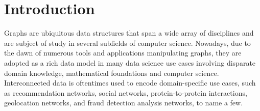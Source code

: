 \section{Introduction}
\label{sec:intro}



Graphs are ubiquitous data structures that span a wide array of disciplines
and are subject of study in several subfields of computer science.
Nowadays, due to the dawn of numerous tools and applications manipulating
graphs, they are adopted as a rich data model in many data science use
cases involving disparate domain knowledge, mathematical foundations and
computer science. Interconnected data is oftentimes used to encode domain-specific
use cases, such as recommendation networks, social networks,
protein-to-protein interactions, geolocation networks, and fraud detection analysis networks, to
name a few.

